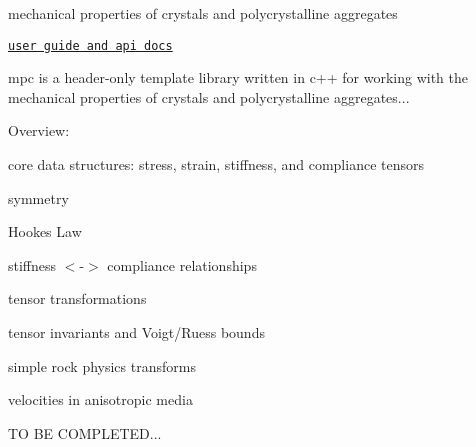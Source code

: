 mechanical properties of crystals and polycrystalline aggregates

\href{https://threecubed.github.io/mpc/}{\tt user guide and api docs}

mpc is a header-\/only template library written in c++ for working with the mechanical properties of crystals and polycrystalline aggregates...

Overview\+:
\begin{DoxyItemize}
\item core data structures\+: stress, strain, stiffness, and compliance tensors
\item symmetry
\item Hooke\textquotesingle{}s Law
\item stiffness $<$-\/$>$ compliance relationships
\item tensor transformations
\item tensor invariants and Voigt/\+Ruess bounds
\item simple rock physics transforms
\item velocities in anisotropic media
\end{DoxyItemize}

TO BE C\+O\+M\+P\+L\+E\+T\+ED... 